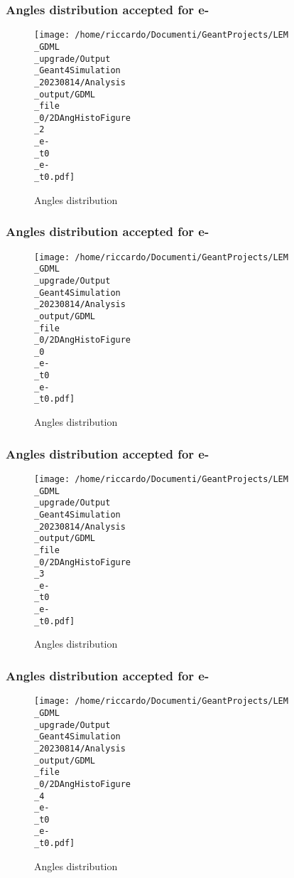 \documentclass[8pt]{beamer}
\begin{document}
            \begin{frame}
                \frametitle{Angles distribution accepted for e-}
            
        \begin{figure}[h]
            \centering
            \texttt{[image: /home/riccardo/Documenti/GeantProjects/LEM\\\_GDML\\\_upgrade/Output\\\_Geant4Simulation\\\_20230814/Analysis\\\_output/GDML\\\_file\\\_0/2DAngHistoFigure\\\_2\\\_e-\\\_t0\\\_e-\\\_t0.pdf]}
            \caption{Angles distribution}
        \end{figure}
        
            \end{frame}
            
            \begin{frame}
                \frametitle{Angles distribution accepted for e-}
            
        \begin{figure}[h]
            \centering
            \texttt{[image: /home/riccardo/Documenti/GeantProjects/LEM\\\_GDML\\\_upgrade/Output\\\_Geant4Simulation\\\_20230814/Analysis\\\_output/GDML\\\_file\\\_0/2DAngHistoFigure\\\_0\\\_e-\\\_t0\\\_e-\\\_t0.pdf]}
            \caption{Angles distribution}
        \end{figure}
        
            \end{frame}
            
            \begin{frame}
                \frametitle{Angles distribution accepted for e-}
            
        \begin{figure}[h]
            \centering
            \texttt{[image: /home/riccardo/Documenti/GeantProjects/LEM\\\_GDML\\\_upgrade/Output\\\_Geant4Simulation\\\_20230814/Analysis\\\_output/GDML\\\_file\\\_0/2DAngHistoFigure\\\_3\\\_e-\\\_t0\\\_e-\\\_t0.pdf]}
            \caption{Angles distribution}
        \end{figure}
        
            \end{frame}
            
            \begin{frame}
                \frametitle{Angles distribution accepted for e-}
            
        \begin{figure}[h]
            \centering
            \texttt{[image: /home/riccardo/Documenti/GeantProjects/LEM\\\_GDML\\\_upgrade/Output\\\_Geant4Simulation\\\_20230814/Analysis\\\_output/GDML\\\_file\\\_0/2DAngHistoFigure\\\_4\\\_e-\\\_t0\\\_e-\\\_t0.pdf]}
            \caption{Angles distribution}
        \end{figure}
        
            \end{frame}
            
\end{document}
